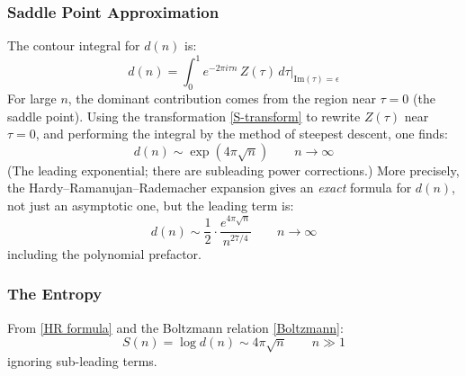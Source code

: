 \subsubsection{Saddle Point Approximation}

The contour integral for $d(n)$ is:
\begin{equation}
    d(n) = \int_0^1 e^{-2\pi i\tau n}\,Z(\tau)\,d\tau
    \bigg|_{\text{Im}(\tau)=\epsilon}
\end{equation}
For large $n$, the dominant contribution comes from the region near $\tau = 0$ 
(the saddle point). Using the transformation \eqref{S-transform} to rewrite 
$Z(\tau)$ near $\tau = 0$, and performing the integral by the method of steepest 
descent, one finds:
\begin{equation}
    d(n) \sim \exp\!\left(4\pi\sqrt{n}\right) \qquad n \to \infty
\end{equation}
(The leading exponential; there are subleading power corrections.) 
More precisely, the Hardy--Ramanujan--Rademacher expansion gives an 
\emph{exact} formula for $d(n)$, not just an asymptotic one, but the 
leading term is:
\begin{equation}\label{HR formula}
    d(n) \sim \frac{1}{2} \cdot \frac{e^{4\pi\sqrt{n}}}{n^{27/4}} 
    \qquad n \to \infty
\end{equation}
including the polynomial prefactor.

\subsubsection{The Entropy}

From \eqref{HR formula} and the Boltzmann relation \eqref{Boltzmann}:
\begin{equation}\label{entropy}
    S(n) = \log d(n) \sim 4\pi\sqrt{n} \qquad n \gg 1
\end{equation}
ignoring sub-leading terms.
